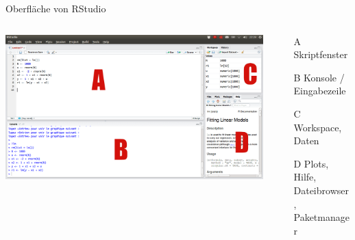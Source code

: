 \documentclass[xcolor=dvipsnames, aspectratio = 169]{beamer}
\begin{document}
\begin{frame}{Oberfläche von RStudio}
\begin{columns}[T]
	\begin{column}{0.6\textwidth}
	\includegraphics[scale=0.65]{Rstudio_interface1}
	\end{column}
	\begin{column}{0.4\textwidth}
	\begin{enumerate}
		\item[A] Skriptfenster
		\item[B] Konsole / Eingabezeile
		\item[C] Workspace, Daten
		\item[D] Plots, Hilfe, Dateibrowser, Paketmanager
	\end{enumerate}
	\end{column}
\end{columns}
\end{frame}
\end{document}
